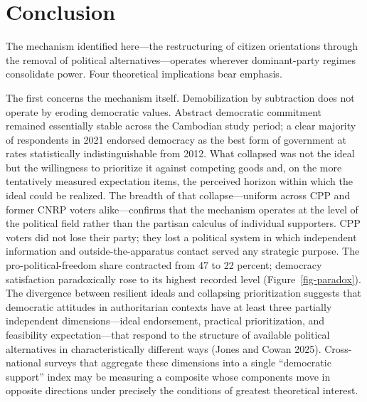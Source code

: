 \documentclass[
  12pt,
  letterpaper]{article}
\begin{document}
\section{Conclusion}\label{conclusion}

The mechanism identified here---the restructuring of citizen
orientations through the removal of political alternatives---operates
wherever dominant-party regimes consolidate power. Four theoretical
implications bear emphasis.

The first concerns the mechanism itself. Demobilization by subtraction
does not operate by eroding democratic values. Abstract democratic
commitment remained essentially stable across the Cambodian study
period; a clear majority of respondents in 2021 endorsed democracy as
the best form of government at rates statistically indistinguishable
from 2012. What collapsed was not the ideal but the willingness to
prioritize it against competing goods and, on the more tentatively
measured expectation items, the perceived horizon within which the ideal
could be realized. The breadth of that collapse---uniform across CPP and
former CNRP voters alike---confirms that the mechanism operates at the
level of the political field rather than the partisan calculus of
individual supporters. CPP voters did not lose their party; they lost a
political system in which independent information and
outside-the-apparatus contact served any strategic purpose. The
pro-political-freedom share contracted from 47 to 22 percent; democracy
satisfaction paradoxically rose to its highest recorded level
(Figure~\ref{fig-paradox}). The divergence between resilient ideals and
collapsing prioritization suggests that democratic attitudes in
authoritarian contexts have at least three partially independent
dimensions---ideal endorsement, practical prioritization, and
feasibility expectation---that respond to the structure of available
political alternatives in characteristically different ways (Jones and
Cowan 2025). Cross-national surveys that aggregate these dimensions into
a single ``democratic support'' index may be measuring a composite whose
components move in opposite directions under precisely the conditions of
greatest theoretical interest.
\end{document}
